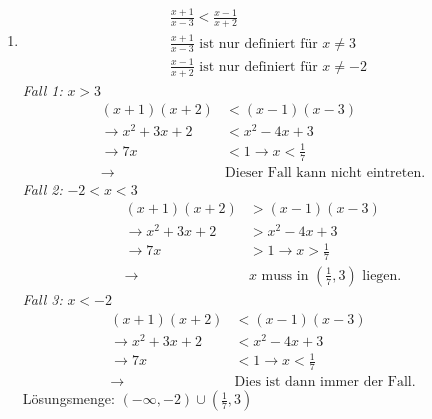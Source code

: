 \begin{enumerate}[label=\alph*)]
\begin{align*}
      x^2 - x - 6 &\leq 2x + 4 \rightarrow x^2 - x - 6 - 2x - 4 \leq 0\\
      &\rightarrow x^2 - 3x - 10 \leq 0\\
      &\text{Für welche } x \text{ ist } x^2 - 3x - 10 = 0 \text{ ?}\\
      &\rightarrow x_{1/2} = \frac{3}{2} \pm \sqrt{\left(\frac{3}{2}\right)^2 - (-10)} = \frac{3}{2} \pm \sqrt{\frac{9}{4} + 10}\\
      &\rightarrow x_{1/2} = \frac{3}{2} \pm \sqrt{\frac{49}{4}} = \frac{3}{2} \pm \frac{7}{2}\\
      &\rightarrow x_1 = 5,\ x_2 = -2
    \end{align*}
    Lösungsmenge: $[-2, 5]$
  \item \begin{align*}
      &\frac{x+1}{x-3} < \frac{x-1}{x+2}\\
      &\frac{x+1}{x-3} \text{ ist nur definiert für } x \neq 3\\
      &\frac{x-1}{x+2} \text{ ist nur definiert für } x \neq -2
    \end{align*}
    \textit{Fall 1: } $x > 3$
    \begin{align*}
      (x+1)(x+2) &< (x-1)(x-3)\\
      \rightarrow x^2 + 3x + 2 &< x^2 - 4x + 3\\
      \rightarrow 7x &< 1 \rightarrow x < \tfrac{1}{7}\\
      \rightarrow &\text{Dieser Fall kann nicht eintreten.}
    \end{align*}
    \textit{Fall 2: } $-2 < x < 3$
    \begin{align*}
      (x+1)(x+2) &> (x-1)(x-3)\\
      \rightarrow x^2 + 3x + 2 &> x^2 - 4x + 3\\
      \rightarrow 7x &> 1 \rightarrow x > \tfrac{1}{7}\\
      \rightarrow &x \text{ muss in } \left(\tfrac{1}{7}, 3\right) \text{ liegen.}
    \end{align*}
    \textit{Fall 3: } $x < -2$
    \begin{align*}
      (x+1)(x+2) &< (x-1)(x-3)\\
      \rightarrow x^2 + 3x + 2 &< x^2 - 4x + 3\\
      \rightarrow 7x &< 1 \rightarrow x < \tfrac{1}{7}\\
      \rightarrow &\text{Dies ist dann immer der Fall.}
    \end{align*}
    Lösungsmenge: $(-\infty, -2) \cup \left(\tfrac{1}{7}, 3\right)$

\end{enumerate}

